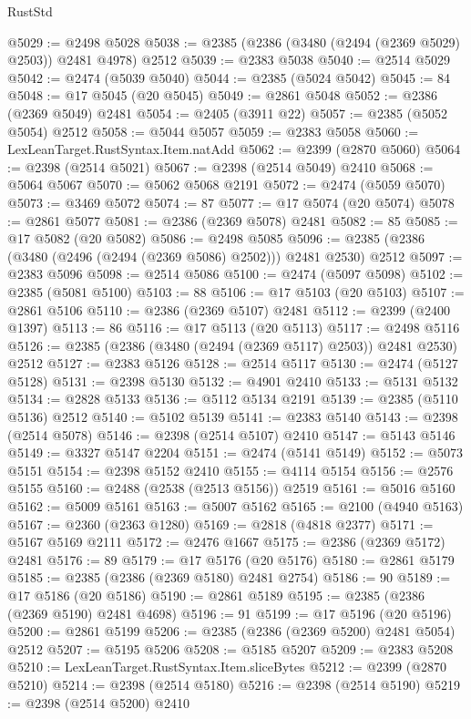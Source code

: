 \begin{lexlean}{RustStd}
\begin{coremodule}
@5029 := @2498 @5028
@5038 := @2385 (@2386 (@3480 (@2494 (@2369 @5029) @2503)) @2481 @4978) @2512
@5039 := @2383 @5038
@5040 := @2514 @5029
@5042 := @2474 (@5039 @5040)
@5044 := @2385 (@5024 @5042)
@5045 := 84
@5048 := @17 @5045 (@20 @5045)
@5049 := @2861 @5048
@5052 := @2386 (@2369 @5049) @2481
@5054 := @2405 (@3911 @22)
@5057 := @2385 (@5052 @5054) @2512
@5058 := @5044 @5057
@5059 := @2383 @5058
@5060 := LexLeanTarget.RustSyntax.Item.natAdd
@5062 := @2399 (@2870 @5060)
@5064 := @2398 (@2514 @5021)
@5067 := @2398 (@2514 @5049) @2410
@5068 := @5064 @5067
@5070 := @5062 @5068 @2191
@5072 := @2474 (@5059 @5070)
@5073 := @3469 @5072
@5074 := 87
@5077 := @17 @5074 (@20 @5074)
@5078 := @2861 @5077
@5081 := @2386 (@2369 @5078) @2481
@5082 := 85
@5085 := @17 @5082 (@20 @5082)
@5086 := @2498 @5085
@5096 := @2385 (@2386 (@3480 (@2496 (@2494 (@2369 @5086) @2502))) @2481 @2530) @2512
@5097 := @2383 @5096
@5098 := @2514 @5086
@5100 := @2474 (@5097 @5098)
@5102 := @2385 (@5081 @5100)
@5103 := 88
@5106 := @17 @5103 (@20 @5103)
@5107 := @2861 @5106
@5110 := @2386 (@2369 @5107) @2481
@5112 := @2399 (@2400 @1397)
@5113 := 86
@5116 := @17 @5113 (@20 @5113)
@5117 := @2498 @5116
@5126 := @2385 (@2386 (@3480 (@2494 (@2369 @5117) @2503)) @2481 @2530) @2512
@5127 := @2383 @5126
@5128 := @2514 @5117
@5130 := @2474 (@5127 @5128)
@5131 := @2398 @5130
@5132 := @4901 @2410
@5133 := @5131 @5132
@5134 := @2828 @5133
@5136 := @5112 @5134 @2191
@5139 := @2385 (@5110 @5136) @2512
@5140 := @5102 @5139
@5141 := @2383 @5140
@5143 := @2398 (@2514 @5078)
@5146 := @2398 (@2514 @5107) @2410
@5147 := @5143 @5146
@5149 := @3327 @5147 @2204
@5151 := @2474 (@5141 @5149)
@5152 := @5073 @5151
@5154 := @2398 @5152 @2410
@5155 := @4114 @5154
@5156 := @2576 @5155
@5160 := @2488 (@2538 (@2513 @5156)) @2519
@5161 := @5016 @5160
@5162 := @5009 @5161
@5163 := @5007 @5162
@5165 := @2100 (@4940 @5163)
@5167 := @2360 (@2363 @1280)
@5169 := @2818 (@4818 @2377)
@5171 := @5167 @5169 @2111
@5172 := @2476 @1667
@5175 := @2386 (@2369 @5172) @2481
@5176 := 89
@5179 := @17 @5176 (@20 @5176)
@5180 := @2861 @5179
@5185 := @2385 (@2386 (@2369 @5180) @2481 @2754)
@5186 := 90
@5189 := @17 @5186 (@20 @5186)
@5190 := @2861 @5189
@5195 := @2385 (@2386 (@2369 @5190) @2481 @4698)
@5196 := 91
@5199 := @17 @5196 (@20 @5196)
@5200 := @2861 @5199
@5206 := @2385 (@2386 (@2369 @5200) @2481 @5054) @2512
@5207 := @5195 @5206
@5208 := @5185 @5207
@5209 := @2383 @5208
@5210 := LexLeanTarget.RustSyntax.Item.sliceBytes
@5212 := @2399 (@2870 @5210)
@5214 := @2398 (@2514 @5180)
@5216 := @2398 (@2514 @5190)
@5219 := @2398 (@2514 @5200) @2410

\end{coremodule}
\end{lexlean}
